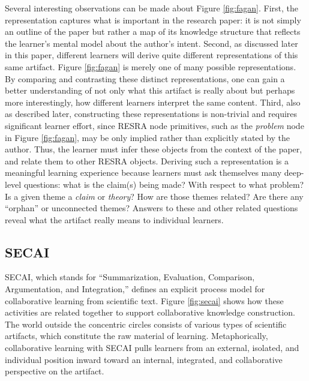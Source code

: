 \begin{figure*}[htb]
 \centerline{}
  \label{fig:fagan}
\end{figure*}

Several interesting observations can be made about Figure \ref{fig:fagan}.
First, the representation captures what is important in the research paper:
it is not simply an outline of the paper but rather a map of its knowledge
structure that reflects the learner's mental model about the author's
intent. Second, as discussed later in this paper, different learners will
derive quite different representations of this same artifact. Figure
\ref{fig:fagan} is merely one of many possible representations. By
comparing and contrasting these distinct representations, one can gain a
better understanding of not only what this artifact is really about but
perhaps more interestingly, how different learners interpret the same
content. Third, also as described later, constructing these representations
is non-trivial and requires significant learner effort, since RESRA node
primitives, such as the {\em problem} node in Figure \ref{fig:fagan}, may
be only implied rather than explicitly stated by the author. Thus, the
learner must infer these objects from the context of the paper, and relate
them to other RESRA objects. Deriving such a representation is a meaningful
learning experience because learners must ask
themselves many deep-level questions: what is the claim(s) being
made? With respect to what problem? Is a given theme a {\it claim\/} or
{\it theory\/}? How are those themes related? Are there any ``orphan'' or
unconnected themes?  Answers to these and other related questions reveal
what the artifact really means to individual learners.


\subsection{SECAI}
\label{sec:secai}

SECAI, which stands for ``Summarization, Evaluation, Comparison,
Argumentation, and Integration,'' defines an explicit process model for
collaborative learning from scientific text. Figure \ref{fig:secai} shows
how these activities are related together to support collaborative
knowledge construction. The world outside the concentric circles consists
of various types of scientific artifacts, which constitute the raw material of
learning.  Metaphorically, collaborative learning with SECAI pulls learners
from an external, isolated, and individual position inward toward an
internal, integrated, and collaborative perspective on the artifact.

